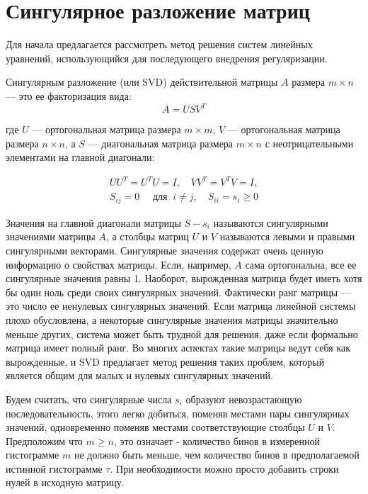 \documentclass[a4paper,12pt]{diplom}
\renewcommand{\geq}{\geqslant}
\begin{document}
\section{Сингулярное разложение матриц}

Для начала предлагается рассмотреть метод решения систем линейных уравнений, использующийся для последующего внедрения регуляризации.

Сингулярным разложение (или SVD) действительной матрицы $A$ размера $m \times n$ — это ее факторизация вида: 
\begin{equation}
    A = U S V^T 
    \label{svd_decomp}
\end{equation}

где $U$ — ортогональная матрица размера $m \times m$, $V$ — ортогональная матрица размера $n \times n$, а $S$ — диагональная матрица размера 
$m \times n$ с неотрицательными элементами на главной диагонали: 

\begin{equation}
    \begin{array}{l}
        U U^T = U^T U = I, \quad VV ^T = V^T V = I, \\
        S_{ij} = 0 \quad \text{ для } \ i \neq j, \quad S_{ii} = s_{i} \geq 0
    \end{array}
\end{equation}

Значения на главной диагонали матрицы $S - s_{i}$  называются сингулярными значениями матрицы $A$, а столбцы матриц $U$ и $V$ называются левыми 
и правыми сингулярными векторами. Сингулярные значения содержат очень ценную информацию о свойствах матрицы. Если, например, 
$A$ сама ортогональна, все ее сингулярные значения равны 1. Наоборот, вырожденная матрица будет иметь хотя бы один ноль среди своих 
сингулярных значений. Фактически ранг матрицы — это число ее ненулевых сингулярных значений. Если матрица линейной системы плохо обусловлена, 
а некоторые сингулярные значения матрицы значительно меньше других, система может быть трудной для решения, даже если формально матрица 
имеет полный ранг. Во многих аспектах такие матрицы ведут себя как вырожденные, и SVD предлагает метод решения таких проблем, который 
является общим для малых и нулевых сингулярных значений.

Будем считать, что сингулярные числа $s_{i}$ образуют невозрастающую последовательность, этого легко добиться, поменяв местами пары сингулярных 
значений, одновременно поменяв местами соответствующие столбцы $U$ и $V$. Предположим что $m \geq n$, это означает - 
количество бинов в измеренной гистограмме $m$ не должно быть меньше, чем количество бинов в предполагаемой истинной гистограмме $\tau$. 
При необходимости можно просто добавить строки нулей в исходную матрицу.
\end{document}
